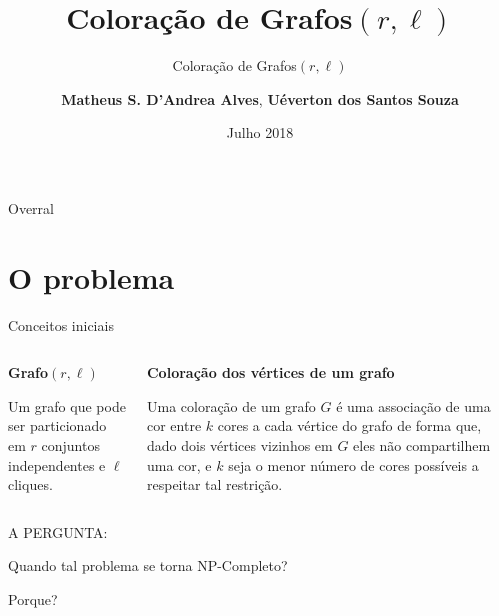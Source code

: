 \documentclass[9pt, compress]{beamer}
\author{\textbf{Matheus S. D'Andrea Alves}, \textbf{Uéverton dos Santos Souza} }
\title{Coloração de Grafos$(r,\ell)$}
\subtitle{Coloração de Grafos$(r,\ell)$}
\institute{\textbf{Universidade Federal Fluminense}}
\date{Julho 2018}
\begin{document}
    \maketitle
    \begin{frame}{Overral}
    \centering
        \tableofcontents
    \end{frame}
    \section{O problema}
    \begin{frame}{Conceitos iniciais}
      \begin{columns}
        \begin{column}{0.5\textwidth}
          \textbf{Grafo$(r,\ell)$}
          
          Um grafo que pode ser particionado em $r$ conjuntos independentes e $\ell$ cliques.
        \end{column}
        \begin{column}{0.5\textwidth}
          \textbf{Coloração dos vértices de um grafo}
          
          Uma coloração de um grafo $G$ é uma associação de uma cor entre $k$ cores a cada vértice do grafo de forma que, dado dois vértices vizinhos em $G$ eles não compartilhem uma cor, e $k$ seja o menor número de cores possíveis a respeitar tal restrição. 
        \end{column}
      \end{columns}
    \end{frame}
    \begin{frame}[standout]
      A PERGUNTA:
      
      Quando tal problema se torna NP-Completo? 
      
      Porque?
    \end{frame}
\end{document}

